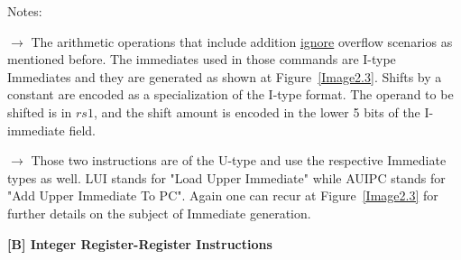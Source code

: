 \begin{threeparttable}
\begin{tablenotes}
			\footnotesize
			\item Notes:
			\item
			 \underline{\textbf{\textcolor{brightgreen}{$\rightarrow$}}} The arithmetic operations that include addition \underline{ignore} overflow scenarios as mentioned before. The immediates used in those commands are I-type Immediates and they are generated as shown at Figure~\ref{Image2.3}. Shifts by a constant are encoded as a specialization of the I-type format. The operand to be shifted is in $rs1$, and the shift amount is encoded in the lower 5 bits of the I-immediate field.
			\item 
			\underline{\textbf{\textcolor{canaryyellow}{$\rightarrow$}}} Those two instructions are of the U-type and use the respective Immediate types as well.  LUI stands for "Load Upper Immediate" while AUIPC stands for "Add Upper Immediate To PC". Again one can recur at Figure~\ref{Image2.3} for further details on the subject of Immediate generation.
			\label{subsubsec:table2.2}
			\vspace{4cm}
		\end{tablenotes}
	\end{threeparttable}
	
	\textbf{ {\footnotesize[B] Integer Register-Register Instructions }} \\
	
